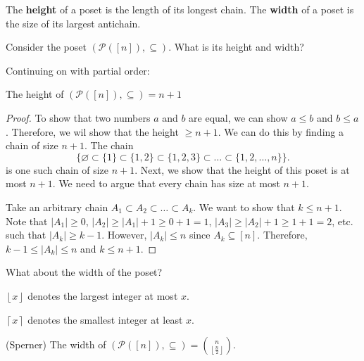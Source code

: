 \documentclass[a4paper]{article}
\begin{document}
\begin{definition}
	The \textbf{height} of a poset is the length of its longest chain. The \textbf{width} of a poset is the size of its largest antichain.
\end{definition}

Consider the poset \( (\mathcal{P}([n]), \subseteq) \). What is its height and width?


Continuing on with partial order:

\begin{prop}
	The height of \( (\mathcal{P}([n]), \subseteq) = n+1\)
\end{prop}

\begin{proof}
	To show that two numbers \( a \) and \( b \) are equal, we can show \( a\le b \) and \( b\le a \). Therefore, we wil show that the height \( \ge n+1 \). We can do this by finding a chain of size \( n+1 \). The chain \[
		\{\varnothing \subset \{1\} \subset \{1,2\} \subset \{1,2,3\} \subset \ldots \subset \{1,2,\ldots ,n\}\}
	.\] is one such chain of size \( n+1 \). Next, we show that the height of this poset is at most \( n+1 \). We need to argue that every chain has size at most \( n+1 \). \par
	Take an arbitrary chain \( A_{1}\subset A_{2}\subset \ldots \subset A_k \). We want to show that \( k\le n+1 \). Note that \( |A_{1}|\ge 0 \), \( |A_{2}|\ge |A_{1}|+1\ge 0+1=1 \), \( |A_{3}|\ge |A_{2}|+1\ge 1+1=2 \), etc. such that \( |A_k| \ge k-1 \). However, \( |A_k| \le n \) since \( A_k \subseteq [n] \). Therefore, \( k-1 \le |A_k| \le n \) and \( k\le n+1 \).
\end{proof}

What about the width of the poset?

\begin{notation}
	\( \left\lfloor x \right\rfloor \) denotes the largest integer at most \( x \).
\end{notation}

\begin{notation}
	\( \left\lceil x \right\rceil  \) denotes the smallest integer at least \( x \).
\end{notation}

\begin{theorem}
	(Sperner) The width of \( (\mathcal{P}([n]), \subseteq) = \binom{n}{\left\lfloor \frac{n}{2} \right\rfloor} \).
\end{theorem}
\end{document}
